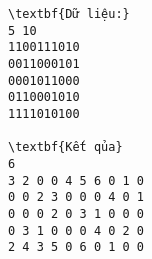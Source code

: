 \begin{verbatim}
\textbf{Dữ liệu:}
5 10
1100111010 
0011000101 
0001011000 
0110001010 
1111010100

\textbf{Kết qủa}
6
3 2 0 0 4 5 6 0 1 0 
0 0 2 3 0 0 0 4 0 1 
0 0 0 2 0 3 1 0 0 0 
0 3 1 0 0 0 4 0 2 0 
2 4 3 5 0 6 0 1 0 0
\end{verbatim}